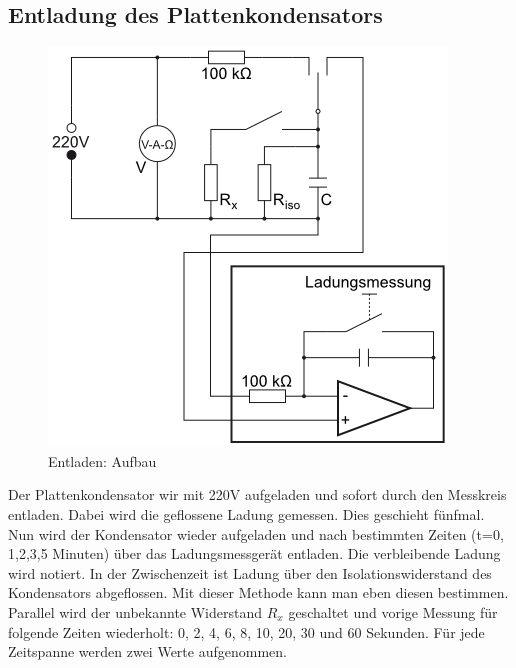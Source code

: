 \documentclass[12pt,a4paper,titlepage,headinclude,bibtotoc]{scrartcl}
\begin{document}
\subsection{Entladung des Plattenkondensators}
\begin{figure}[!htb]
	\centering
	\includegraphics[scale=1.0]{Entladen.png}
	\caption{Entladen: Aufbau \cite[Datum: 25.09.2014]{LP11}}
	\label{fig:Entladen}
\end{figure}

Der  Plattenkondensator wir mit 220V aufgeladen und sofort durch den Messkreis entladen.
Dabei wird die geflossene Ladung gemessen.
Dies geschieht fünfmal.\\
Nun wird der Kondensator wieder aufgeladen und nach bestimmten Zeiten (t=0, 1,2,3,5 Minuten) über das Ladungsmessgerät entladen.
Die verbleibende Ladung wird notiert.
In der Zwischenzeit ist Ladung über den Isolationswiderstand des Kondensators abgeflossen.
Mit dieser Methode kann man eben diesen bestimmen.\\
Parallel wird der unbekannte Widerstand $R_x$ geschaltet und vorige Messung für folgende Zeiten wiederholt: 0, 2, 4, 6, 8, 10, 20, 30 und 60 Sekunden.
Für jede Zeitspanne werden zwei Werte aufgenommen.
\end{document}
